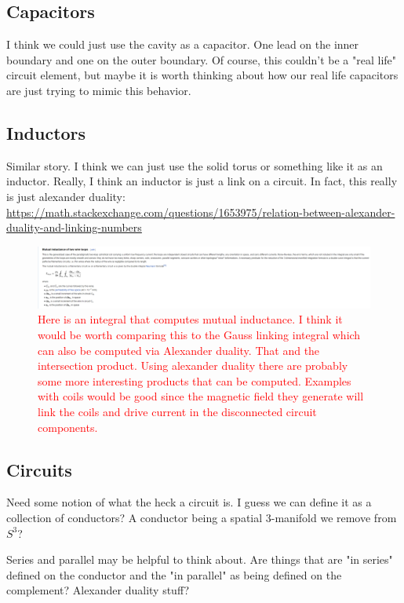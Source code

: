 \documentclass{article}
\begin{document}
\subsection{Capacitors}
I think we could just use the cavity as a capacitor. One lead on the inner boundary and one on the outer boundary. Of course, this couldn't be a "real life" circuit element, but maybe it is worth thinking about how our real life capacitors are just trying to mimic this behavior.

\subsection{Inductors}
Similar story. I think we can just use the solid torus or something like it as an inductor. Really, I think an inductor is just a link on a circuit. In fact, this really is just alexander duality: \url{https://math.stackexchange.com/questions/1653975/relation-between-alexander-duality-and-linking-numbers}

\begin{figure}[H]
    \centering
    \includegraphics[width=\textwidth]{figures/mutual_inductance.png}
    \caption{\textcolor{red}{Here is an integral that computes mutual inductance. I think it would be worth comparing this to the Gauss linking integral which can also be computed via Alexander duality. That and the intersection product. Using alexander duality there are probably some more interesting products that can be computed. Examples with coils would be good since the magnetic field they generate will link the coils and drive current in the disconnected circuit components.}}
\end{figure}

\subsection{Circuits}

Need some notion of what the heck a circuit is. I guess we can define it as a collection of conductors? A conductor being a spatial 3-manifold we remove from $S^3$?

Series and parallel may be helpful to think about. Are things that are "in series" defined on the conductor and the "in parallel" as being defined on the complement? Alexander duality stuff?
\end{document}
